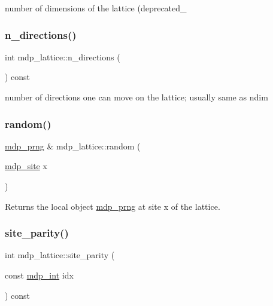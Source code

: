 number of dimensions of the lattice (deprecated\+\_\+ 

\mbox{\label{classmdp__lattice_afc12335416009cc673581a014137ef3f}} 
\subsubsection{\texorpdfstring{n\+\_\+directions()}{n\_directions()}}
{\footnotesize\ttfamily int mdp\+\_\+lattice\+::n\+\_\+directions (\begin{DoxyParamCaption}{ }\end{DoxyParamCaption}) const\hspace{0.3cm}{\ttfamily [inline]}}



number of directions one can move on the lattice; usually same as ndim 

\mbox{\label{classmdp__lattice_a93f774075f5829c57009c644a74cfd4a}} 
\subsubsection{\texorpdfstring{random()}{random()}}
{\footnotesize\ttfamily \hyperlink{classmdp__prng}{mdp\+\_\+prng} \& mdp\+\_\+lattice\+::random (\begin{DoxyParamCaption}\item[{\hyperlink{classmdp__site}{mdp\+\_\+site}}]{x }\end{DoxyParamCaption})\hspace{0.3cm}{\ttfamily [inline]}}



Returns the local object \hyperlink{classmdp__prng}{mdp\+\_\+prng} at site x of the lattice. 

\mbox{\label{classmdp__lattice_ac2d4436f300d5528e2c25bf5493df0a7}} 
\subsubsection{\texorpdfstring{site\+\_\+parity()}{site\_parity()}}
{\footnotesize\ttfamily int mdp\+\_\+lattice\+::site\+\_\+parity (\begin{DoxyParamCaption}\item[{const \hyperlink{mdp__global__vars_8h_aaa1ad9d0dcd2124aa5af0120d9954174}{mdp\+\_\+int}}]{idx }\end{DoxyParamCaption}) const\hspace{0.3cm}{\ttfamily [inline]}}

